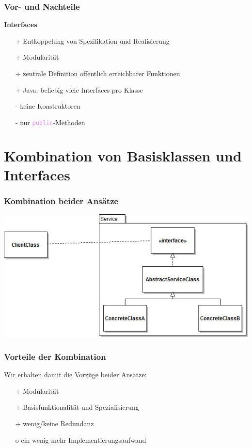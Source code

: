 \documentclass[12pt]{beamer}
\newcommand{\javakeyword}[1]{\textcolor{violet}{\texttt{{#1}}}}
\begin{document}
\begin{frame}
	\frametitle{Vor- und Nachteile}
	\textbf{Interfaces}
	\newline
	\begin{itemize}
		\item[+] Entkoppelung von Spezifikation und Realisierung
		\item[+] Modularität
		\item[+] zentrale Definition öffentlich erreichbarer Funktionen
		\item[+] Java: beliebig viele Interfaces pro Klasse
		\item[-] keine Konstruktoren
		\item[-] nur \javakeyword{public}-Methoden
	\end{itemize}
\end{frame}

\section{Kombination von Basisklassen und Interfaces}

\begin{frame}
	\frametitle{Kombination beider Ansätze}
	\centerline{\includegraphics[scale=0.5]{src/img/Kombi}}
\end{frame}

\begin{frame}
	\frametitle{Vorteile der Kombination}
	Wir erhalten damit die Vorzüge beider Ansätze:
	\begin{itemize}
		\item[+] Modularität
		\item[+] Basisfunktionalität und Spezialisierung
		\item[+] wenig/keine Redundanz
		\item[o] ein wenig mehr Implementierungsaufwand
	\end{itemize}
\end{frame}
\end{document}
